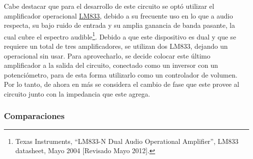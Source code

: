 Cabe destacar que para el desarrollo de este circuito se optó utilizar el amplificador operacional \href{http://www.ti.com/lit/ds/symlink/lm833-n.pdf}{LM833}, debido a su frecuente uso en lo que a audio respecta, su bajo ruido de entrada y su amplia ganancia de banda pasante, la cual cubre el espectro audible\footnote{Texas Instruments, ``LM833-N Dual Audio Operational Amplifier'', LM833 datasheet, Mayo 2004 [Revisado Mayo 2012].}. Debido a que este dispositivo es dual y que se requiere un total de tres amplificadores, se utilizan dos LM833, dejando un operacional sin usar. Para aprovecharlo, se decide colocar este último amplificador a la salida del circuito, conectado como un inversor con un potenciómetro, para de esta forma utilizarlo como un controlador de volumen. Por lo tanto, de ahora en más se considera el cambio de fase que este provee al circuito junto con la impedancia que este agrega.   

\subsubsection{Comparaciones}

